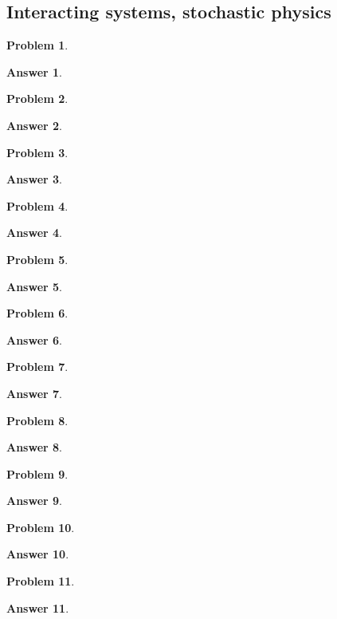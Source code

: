 \documentclass[a4paper]{article}
\newtheorem{ans}{Answer}[section]
\theoremstyle{new}
\newtheorem{qns}{Problem}[section]
\begin{document}
\subsection*{Interacting systems, stochastic physics}
\begin{qns}

\end{qns}
\begin{ans}

\end{ans}
\begin{qns}

\end{qns}
\begin{ans}

\end{ans}
\newpage
\begin{qns}

\end{qns}
\begin{ans}

\end{ans}
\begin{qns}

\end{qns}
\begin{ans}

\end{ans}
\newpage
\begin{qns}

\end{qns}
\begin{ans}

\end{ans}
\begin{qns}

\end{qns}
\begin{ans}

\end{ans}
\newpage
\begin{qns}

\end{qns}
\begin{ans}

\end{ans}
\begin{qns}

\end{qns}
\begin{ans}

\end{ans}
\newpage
\begin{qns}

\end{qns}
\begin{ans}

\end{ans}
\begin{qns}

\end{qns}
\begin{ans}

\end{ans}
\begin{qns}

\end{qns}
\begin{ans}

\end{ans}
\end{document}

